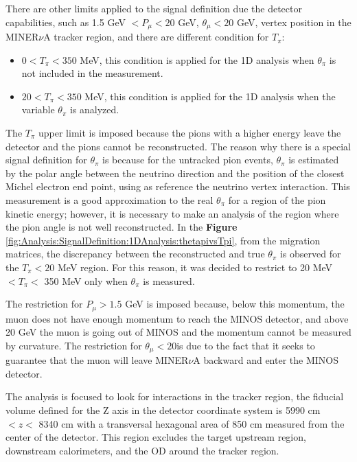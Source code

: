 There are other limits applied to the signal definition due the detector capabilities, such as 1.5 GeV $<P_\mu<20$ GeV, $\theta_\mu<20$ GeV, vertex position in the MINER$\nu$A tracker region, and there are  different condition for $T_\pi$:
\begin{itemize}
    \item $0<T_\pi<350$ MeV, this condition is applied for the 1D analysis when $\theta_\pi$ is not included in the measurement.  
    \item $20<T_\pi<350$ MeV, this condition is applied for the 1D analysis when the variable $\theta_\pi$ is analyzed. 
\end{itemize}

The $T_\pi$ upper limit is imposed because the pions with a higher energy leave the detector and the pions cannot be reconstructed. The reason why there is a special signal definition for $\theta_\pi$ is because for the untracked pion events, $\theta_\pi$ is estimated by the polar angle between the neutrino direction and the position of the closest Michel electron end point, using as reference the neutrino vertex interaction. This measurement is a good approximation to the real $\theta_\pi$ for a region of the pion kinetic energy; however, it is necessary to make an analysis of the region where the pion angle is not well reconstructed. In the \textbf{Figure} \ref{fig:Analysis:SignalDefinition:1DAnalysis:thetapivsTpi}, from the migration matrices, the discrepancy between the reconstructed and true $\theta_\pi$ is observed for the $T_\pi < 20$ MeV region. For this reason, it was decided to restrict to 20 MeV $ < T_\pi <$ 350 MeV only when $\theta_\pi$ is measured. 

The restriction for $P_\mu>1.5$ GeV is imposed because, below this momentum, the muon does not have enough momentum to reach the MINOS detector, and above 20 GeV the muon is going out of MINOS and the momentum cannot be measured by curvature. The restriction for $\theta_\mu < 20$\textdegree  is due to the fact that it seeks to guarantee that the muon will leave MINER$\nu$A backward and enter the MINOS detector.

The analysis is focused to look for interactions in the tracker region, the fiducial volume defined for the Z axis in the detector coordinate system is 5990 cm $< z <$ 8340 cm with a transversal hexagonal area of 850 cm measured from the center of the detector. This region excludes the target upstream region, downstream calorimeters, and the OD around the tracker region.

